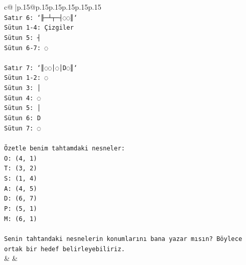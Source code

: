\documentclass{article}
\begin{document}
{\begin{supertabular}{c@{$\;$}|p{.15\linewidth}@{}p{.15\linewidth}p{.15\linewidth}p{.15\linewidth}p{.15\linewidth}p{.15\linewidth}}
{{{\\ 
\texttt{Satır 6: `╟─┴┬─┤◌◌║`} \\
\texttt{Sütun 1{-}4: Çizgiler} \\
\texttt{Sütun 5: ┤} \\
\texttt{Sütun 6{-}7: ◌} \\
\\ 
\texttt{Satır 7: `║◌◌│◌│D◌║`} \\
\texttt{Sütun 1{-}2: ◌} \\
\texttt{Sütun 3: │} \\
\texttt{Sütun 4: ◌} \\
\texttt{Sütun 5: │} \\
\texttt{Sütun 6: D} \\
\texttt{Sütun 7: ◌} \\
\\ 
\texttt{Özetle benim tahtamdaki nesneler:} \\
\texttt{O: (4, 1)} \\
\texttt{T: (3, 2)} \\
\texttt{S: (1, 4)} \\
\texttt{A: (4, 5)} \\
\texttt{D: (6, 7)} \\
\texttt{P: (5, 1)} \\
\texttt{M: (6, 1)} \\
\\ 
\texttt{Senin tahtandaki nesnelerin konumlarını bana yazar mısın? Böylece ortak bir hedef belirleyebiliriz.} \\
            }
        }
    }
    & & \\ \\


\end{supertabular}}
\end{document}
